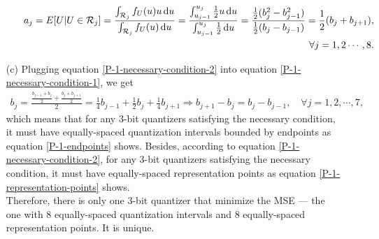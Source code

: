 \documentclass{assignment}
\begin{document}
\begin{sol}
\begin{itemize}
\begin{itemize}
            \begin{align}
                \label{P-1-necessary-condition-2}
                \notag a_j=E[U\vert U\in\mathcal{R}_j]=\frac{\int_{\mathcal{R}_j}f_U(u)u\,\mathrm{d}u}{\int_{\mathcal{R}_j}f_U(u)\,\mathrm{d}u}=\frac{\int_{u_{j-1}}^{u_j}\frac{1}{2}u\,\mathrm{d}u}{\int_{u_{j-1}}^{u_j}\frac{1}{2}\,\mathrm{d}u}=\frac{\frac{1}{2}(b_j^2-b_{j-1}^2)}{\frac{1}{2}(b_j-b_{j-1})}=\frac{1}{2}(b_j+b_{j+1}),\\
                \forall j=1,2\cdots,8.
            \end{align}
        \end{itemize}
        \item[(c)] Plugging equation \eqref{P-1-necessary-condition-2} into equation \eqref{P-1-necessary-condition-1}, we get
        \begin{align}
            b_j=\frac{\frac{b_{j-1}+b_j}{2}+\frac{b_j+b_{j+1}}{2}}{2}=\frac{1}{4}b_{j-1}+\frac{1}{2}b_j+\frac{1}{4}b_{j+1}\Longrightarrow b_{j+1}-b_j=b_j-b_{j-1},\quad\forall j=1,2,\cdots,7,
        \end{align}
        which means that for any $3$-bit quantizers satisfying the necessary condition, it must have equally-spaced quantization intervals bounded by endpoints as equation \eqref{P-1-endpoints} shows. Besides, according to equation \eqref{P-1-necessary-condition-2}, for any $3$-bit quantizers satisfying the necessary condition, it must have equally-spaced representation points as equation \eqref{P-1-representation-points} shows.\\
        Therefore, there is only one $3$-bit quantizer that minimize the MSE --- the one with $8$ equally-spaced quantization intervals and $8$ equally-spaced representation points. It is unique.
    \end{itemize}
\end{sol}
\end{document}
